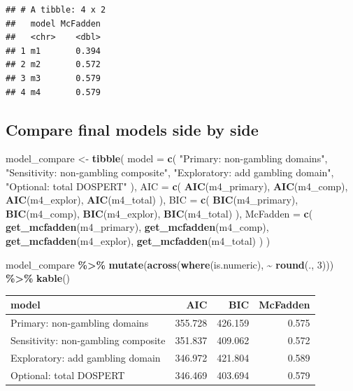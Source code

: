 \documentclass[
]{article}
\newenvironment{Shaded}{\begin{snugshade}}{\end{snugshade}}
\newcommand{\AttributeTok}[1]{\textcolor[rgb]{0.13,0.29,0.53}{#1}}
\newcommand{\DecValTok}[1]{\textcolor[rgb]{0.00,0.00,0.81}{#1}}
\newcommand{\FunctionTok}[1]{\textcolor[rgb]{0.13,0.29,0.53}{\textbf{#1}}}
\newcommand{\NormalTok}[1]{#1}
\newcommand{\OtherTok}[1]{\textcolor[rgb]{0.56,0.35,0.01}{#1}}
\newcommand{\SpecialCharTok}[1]{\textcolor[rgb]{0.81,0.36,0.00}{\textbf{#1}}}
\newcommand{\StringTok}[1]{\textcolor[rgb]{0.31,0.60,0.02}{#1}}
\begin{document}
\begin{verbatim}
## # A tibble: 4 x 2
##   model McFadden
##   <chr>    <dbl>
## 1 m1       0.394
## 2 m2       0.572
## 3 m3       0.579
## 4 m4       0.579
\end{verbatim}

\subsection{Compare final models side by
side}\label{compare-final-models-side-by-side}

\begin{Shaded}
\begin{Highlighting}[]
\NormalTok{model\_compare }\OtherTok{\textless{}{-}} \FunctionTok{tibble}\NormalTok{(}
  \AttributeTok{model =} \FunctionTok{c}\NormalTok{(}
    \StringTok{"Primary: non{-}gambling domains"}\NormalTok{,}
    \StringTok{"Sensitivity: non{-}gambling composite"}\NormalTok{,}
    \StringTok{"Exploratory: add gambling domain"}\NormalTok{,}
    \StringTok{"Optional: total DOSPERT"}
\NormalTok{  ),}
  \AttributeTok{AIC =} \FunctionTok{c}\NormalTok{(}
    \FunctionTok{AIC}\NormalTok{(m4\_primary),}
    \FunctionTok{AIC}\NormalTok{(m4\_comp),}
    \FunctionTok{AIC}\NormalTok{(m4\_explor),}
    \FunctionTok{AIC}\NormalTok{(m4\_total)}
\NormalTok{  ),}
  \AttributeTok{BIC =} \FunctionTok{c}\NormalTok{(}
    \FunctionTok{BIC}\NormalTok{(m4\_primary),}
    \FunctionTok{BIC}\NormalTok{(m4\_comp),}
    \FunctionTok{BIC}\NormalTok{(m4\_explor),}
    \FunctionTok{BIC}\NormalTok{(m4\_total)}
\NormalTok{  ),}
  \AttributeTok{McFadden =} \FunctionTok{c}\NormalTok{(}
    \FunctionTok{get\_mcfadden}\NormalTok{(m4\_primary),}
    \FunctionTok{get\_mcfadden}\NormalTok{(m4\_comp),}
    \FunctionTok{get\_mcfadden}\NormalTok{(m4\_explor),}
    \FunctionTok{get\_mcfadden}\NormalTok{(m4\_total)}
\NormalTok{  )}
\NormalTok{)}

\NormalTok{model\_compare }\SpecialCharTok{\%\textgreater{}\%}
  \FunctionTok{mutate}\NormalTok{(}\FunctionTok{across}\NormalTok{(}\FunctionTok{where}\NormalTok{(is.numeric), }\SpecialCharTok{\textasciitilde{}} \FunctionTok{round}\NormalTok{(., }\DecValTok{3}\NormalTok{))) }\SpecialCharTok{\%\textgreater{}\%}
  \FunctionTok{kable}\NormalTok{()}
\end{Highlighting}
\end{Shaded}

\begin{longtable}[]{@{}lrrr@{}}
\toprule\noalign{}
model & AIC & BIC & McFadden \\
\midrule\noalign{}
\endhead
\bottomrule\noalign{}
\endlastfoot
Primary: non-gambling domains & 355.728 & 426.159 & 0.575 \\
Sensitivity: non-gambling composite & 351.837 & 409.062 & 0.572 \\
Exploratory: add gambling domain & 346.972 & 421.804 & 0.589 \\
Optional: total DOSPERT & 346.469 & 403.694 & 0.579 \\
\end{longtable}
\end{document}
